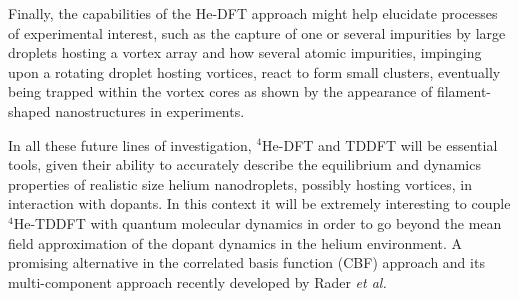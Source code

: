 	Finally, the capabilities of the He-DFT approach might help elucidate processes of experimental interest, such as the capture of one or several impurities by large droplets hosting a vortex array and how several atomic impurities, impinging upon a rotating droplet hosting vortices, react to form small clusters, eventually being trapped within the vortex cores as shown by the appearance of filament-shaped nanostructures in experiments.
	
	In all these future lines of investigation, $^4$He-DFT and TDDFT will be essential tools, given their ability to accurately describe the equilibrium and dynamics properties of realistic size helium nanodroplets, possibly hosting vortices, in interaction with dopants. In this context it will be extremely interesting to couple $^4$He-TDDFT with quantum molecular dynamics in order to go beyond the mean field approximation of the dopant dynamics in the helium environment. A promising alternative in the correlated basis function (CBF) approach and its multi-component approach recently developed by Rader \textit{et al.}\citep{Rader2017}